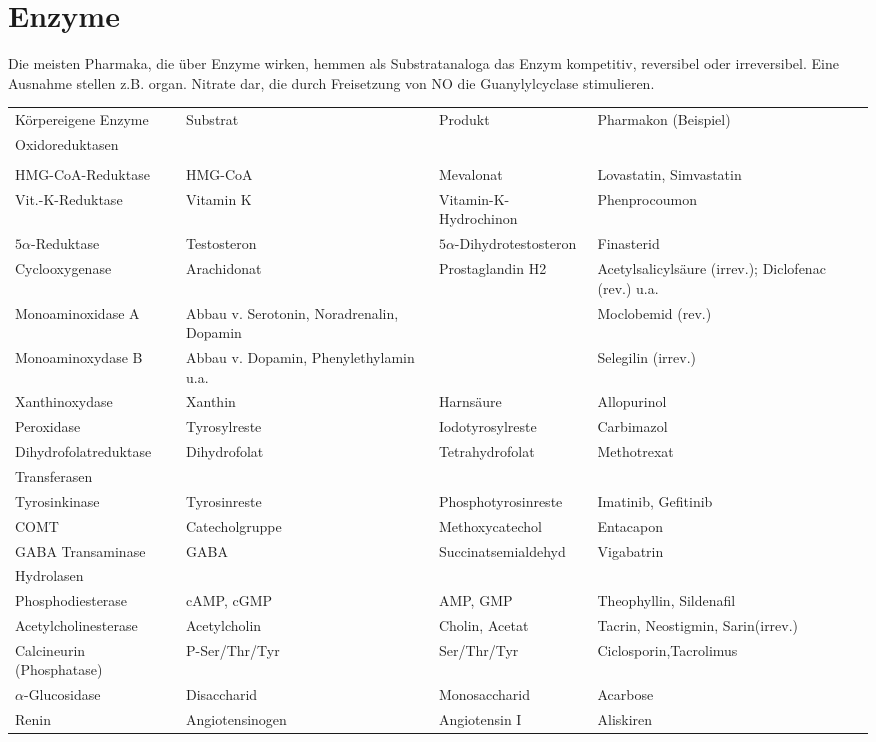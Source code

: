 \documentclass[10pt,a4paper]{report}
\begin{document}
\section{Enzyme}
Die meisten Pharmaka, die über Enzyme wirken, hemmen als Substratanaloga das Enzym kompetitiv, reversibel oder irreversibel. Eine Ausnahme stellen z.B. organ. Nitrate dar, die durch Freisetzung von NO die Guanylylcyclase stimulieren.\\
\begin{tabularx}{\textwidth}{X|X|X|X}
Körpereigene Enzyme&Substrat&Produkt&Pharmakon (Beispiel)\\
Oxidoreduktasen&&&\\ \hline
&&&\\
HMG-CoA-Reduktase&HMG-CoA&Mevalonat&Lovastatin, Simvastatin\\
Vit.-K-Reduktase&Vitamin K&Vitamin-K-Hydrochinon&Phenprocoumon\\
$5\alpha$-Reduktase&Testosteron&$5\alpha$-Dihydrotestosteron&Finasterid\\
Cyclooxygenase&Arachidonat&Prostaglandin H2&Acetylsalicylsäure (irrev.); Diclofenac (rev.) u.a.\\
Monoaminoxidase A&Abbau v. Serotonin, Noradrenalin, Dopamin&&Moclobemid (rev.)\\
Monoaminoxydase B&Abbau v. Dopamin, Phenylethylamin u.a.&&Selegilin (irrev.)\\
Xanthinoxydase&Xanthin&Harnsäure&Allopurinol\\
Peroxidase&Tyrosylreste&Iodotyrosylreste&Carbimazol\\
Dihydrofolatreduktase&Dihydrofolat&Tetrahydrofolat&Methotrexat\\
Transferasen&&&\\
Tyrosinkinase&Tyrosinreste&Phosphotyrosinreste&Imatinib, Gefitinib\\
COMT&Catecholgruppe&Methoxycatechol&Entacapon\\
GABA Transaminase&GABA&Succinatsemialdehyd&Vigabatrin\\
Hydrolasen&&&\\
Phosphodiesterase&cAMP, cGMP&AMP, GMP&Theophyllin, Sildenafil\\
Acetylcholinesterase&Acetylcholin&Cholin, Acetat&Tacrin, Neostigmin, Sarin(irrev.)\\
Calcineurin (Phosphatase)&P-Ser/Thr/Tyr&Ser/Thr/Tyr&Ciclosporin,Tacrolimus\\
$\alpha$-Glucosidase&Disaccharid&Monosaccharid&Acarbose\\
Renin&Angiotensinogen&Angiotensin I&Aliskiren\\

\end{tabularx}
\end{document}
